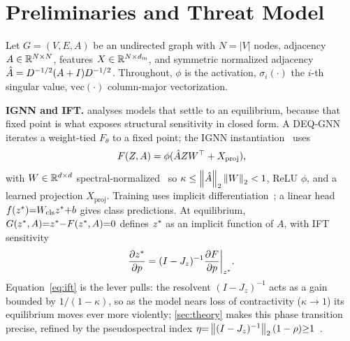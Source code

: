 \section{Preliminaries and Threat Model}
\label{sec:background}

Let $G = (V, E, A)$ be an undirected graph with $N = |V|$ nodes, adjacency $A \in \mathbb{R}^{N \times N}$, features $X \in \mathbb{R}^{N \times d_{\mathrm{in}}}$, and symmetric normalized adjacency $\hat{A} = D^{-1/2}(A + I)D^{-1/2}$. Throughout, $\phi$ is the activation, $\sigma_i(\cdot)$ the $i$-th singular value, $\mathrm{vec}(\cdot)$ column-major vectorization.

\textbf{IGNN and IFT.} \AEGIS analyses models that settle to an equilibrium, because that fixed point is what exposes structural sensitivity in closed form. A DEQ-GNN~\cite{bai2019deep,bai2020multiscale} iterates a weight-tied $F_\theta$ to a fixed point; the IGNN instantiation~\cite{gu2020implicit} uses
\begin{equation}
F(Z, A) = \phi(\hat{A} Z W^\top + X_{\mathrm{proj}}),
\label{eq:ignn_operator}
\end{equation}
with $W \in \mathbb{R}^{d \times d}$ spectral-normalized~\cite{miyato2018spectral} so $\kappa \leq \left\|\hat{A}\right\|_2 \left\|W\right\|_2 < 1$, ReLU $\phi$, and a learned projection $X_\mathrm{proj}$. Training uses implicit differentiation~\cite{gould2021deep,fung2022jfb,bai2021stabilizing}; a linear head $f(z^{*}){=}W_\mathrm{cls}z^{*}{+}b$ gives class predictions. At equilibrium, $G(z^{*},A){=}z^{*}{-}F(z^{*},A){=}0$ defines $z^{*}$ as an implicit function of $A$, with IFT sensitivity
\begin{equation}
\frac{\partial z^{*}}{\partial p} = (I - J_z)^{-1} \frac{\partial F}{\partial p}\bigg|_{z^{*}}.
\label{eq:ift}
\end{equation}
Equation~\eqref{eq:ift} is the lever \AEGIS pulls: the resolvent $(I-J_z)^{-1}$ acts as a gain bounded by $1/(1-\kappa)$, so as the model nears loss of contractivity ($\kappa\!\to\!1$) its equilibrium moves ever more violently; \cref{sec:theory} makes this phase transition precise, refined by the pseudospectral index $\eta{=}\left\|(I-J_z)^{-1}\right\|_2(1-\rho){\geq}1$~\cite{trefethen2005spectra}.

